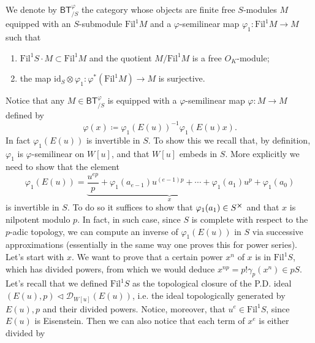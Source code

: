 \begin{defn}[]
	We denote by $\mathsf{BT}^{\varphi}_{/S}$ the category
	whose objects are finite free $S$-modules $M$
	equipped with an $S$-submodule $\mathrm{Fil}^1 M$
	and a $\varphi$-semilinear map $\varphi_1\colon  \mathrm{Fil}^1 M \to M$
	such that
\begin{enumerate}
	\item $\mathrm{Fil}^1 S \cdot M \subset \mathrm{Fil}^1 M$
		and the quotient $M/\mathrm{Fil}^1 M$ is a free $O_{ K }$-module;
	\item the map $\mathrm{id}_{ S } \otimes \varphi_1\colon 
		\varphi^* \left( \mathrm{Fil}^1 M \right) \to M$
		is surjective.
\end{enumerate}
\end{defn}


\begin{rem}[]\label{invertibilityphi1E(u))}
	Notice that any $M \in \mathsf{BT}^{\varphi}_{/S}$ is equipped with a 
	$\varphi$-semilinear map $\varphi\colon M \to M$ defined by
	\begin{equation*}
		\varphi (x) \coloneqq \varphi_1 \left( E(u) \right)^{-1} \varphi_1 (E(u)x)
	.\end{equation*}
	In fact $\varphi_1(E(u))$ is invertible in $S$.
	To show this we recall that, by definition, $\varphi_1$ is
	$\varphi$-semilinear on $W[u]$, and that $W[u]$ embeds in $S$.
	More explicitly we need to show that the element
	\begin{equation*}
		\varphi_1(E(u)) =
		\underbrace{\frac{ u^{ep} }{ p } + \varphi_1(a_{e-1}) u^{(e-1)p} +
		\cdots + \varphi_1(a_1)u^p}_{x} + \varphi_1(a_0)
	\end{equation*}
	is invertible in $S$.
	To do so it suffices to show that $\varphi_1(a_1) \in S^{\cross}$ and
	that $x$ is nilpotent modulo $p$. 
	In fact, in such case, since $S$ is complete with respect to the
	$p$-adic topology, we can compute an inverse of $\varphi_1(E(u))$
	in $S$ via successive approximations (essentially in the same
	way one proves this for power series).
	Let's start with $x$.
	We want to prove that a certain power $x^n$ of $x$
	is in $\mathrm{Fil}^1S$, which has divided powers,
	from which we would deduce $x^{np} = p! \gamma_p(x^n) \in pS$.
	Let's recall that we defined $\mathrm{Fil}^1S$ as the topological
	closure of the P.D. ideal $(E(u),p) \triangleleft \mathcal{D}_{W[u]}(E(u))$,
	i.e. the ideal topologically generated by $E(u), p$ and their divided powers.
	Notice, moreover, that $u^e \in \mathrm{Fil}^1S$, since $E(u)$ is
	Eisenstein.
	Then we can also notice that each term of $x^e$ is either divided by

\end{rem}
